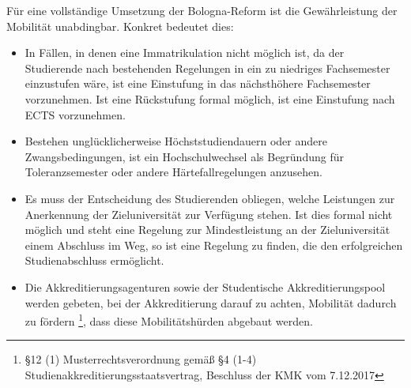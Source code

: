        Für eine vollständige Umsetzung der Bologna-Reform ist die Gewährleistung der Mobilität unabdingbar. Konkret bedeutet dies: 
        \begin{itemize}
          \item In Fällen, in denen eine Immatrikulation nicht möglich ist, da der Studierende nach bestehenden Regelungen in ein zu niedriges Fachsemester einzustufen wäre, ist eine Einstufung in das nächsthöhere Fachsemester vorzunehmen. Ist eine Rückstufung formal möglich, ist eine Einstufung nach ECTS vorzunehmen.
          \item Bestehen unglücklicherweise Höchststudiendauern oder andere Zwangsbedingungen, ist ein Hochschulwechsel als Begründung für Toleranzsemester oder andere Härtefallregelungen anzusehen.
          \item Es muss der Entscheidung des Studierenden obliegen, welche Leistungen zur Anerkennung der Zieluniversität zur Verfügung stehen. Ist dies formal nicht möglich und steht eine Regelung zur Mindestleistung an der Zieluniversität einem Abschluss im Weg, so ist eine Regelung zu finden, die den erfolgreichen Studienabschluss ermöglicht.
          \item Die Akkreditierungsagenturen sowie der Studentische Akkreditierungspool werden gebeten, bei der Akkreditierung darauf zu achten, Mobilität dadurch zu fördern \footnote{§12 (1) Musterrechtsverordnung gemäß §4 (1-4) Studienakkreditierungsstaatsvertrag, Beschluss der KMK vom 7.12.2017}, dass diese Mobilitätshürden abgebaut werden.
        \end{itemize}
